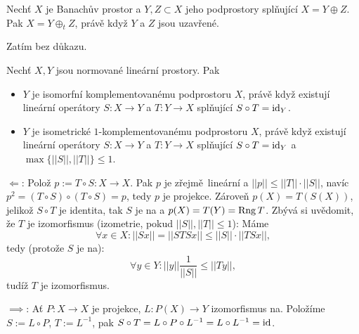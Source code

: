 \documentclass[12pt]{article}					%
\begin{document}
\begin{veta}
	Nechť $X$ je Banachův prostor a $Y, Z \subset X$ jeho podprostory splňující $X = Y \oplus Z$. Pak $X = Y \oplus_t Z$, právě když $Y$ a $Z$ jsou uzavřené.

	\begin{dukazin}
		Zatím bez důkazu.
	\end{dukazin}
\end{veta}

\begin{veta}
	Nechť $X, Y$ jsou normované lineární prostory. Pak

	\begin{itemize}
		\item $Y$ je isomorfní komplementovanému podprostoru $X$, právě když existují lineární operátory $S: X \rightarrow Y$ a $T: Y \rightarrow X$ splňující $S \circ T = \operatorname{id}_Y$.
		\item $Y$ je isometrické $1$-komplementovanému podprostoru $X$, právě když existují lineární operátory $S: X \rightarrow Y$ a $T: Y \rightarrow X$ splňující $S \circ T = \operatorname{id}_Y$ a $\max\{||S||, ||T||\} ≤ 1$.
	\end{itemize}

	\begin{dukazin}
		$\Leftarrow$: Polož $p := T \circ S: X \rightarrow X$. Pak $p$ je zřejmě lineární a $||p|| ≤ ||T||·||S||$, navíc $p^2 = (T\circ S)\circ(T \circ S) = p$, tedy $p$ je projekce. Zároveň $p(X) = T(S(X))$, jelikož $S \circ T$ je identita, tak $S$ je na a $p(X) = T(Y) = \operatorname{Rng} T$. Zbývá si uvědomit, že $T$ je izomorfismus (izometrie, pokud $||S||, ||T|| ≤ 1$): Máme
		$$ \forall x \in X: ||S x|| = ||STS x|| ≤ ||S||·||TS x||, $$
		tedy (protože $S$ je na):
		$$ \forall y \in Y: ||y||\frac{1}{||S||} ≤ ||Ty||, $$
		tudíž $T$ je izomorfismus.

		$\implies$: Ať $P: X \rightarrow X$ je projekce, $L: P(X) \rightarrow Y$ izomorfismus na. Položíme $S := L \circ P$, $T := L^{-1}$, pak $S \circ T = L \circ P \circ L^{-1} = L \circ L^{-1} = \operatorname{id}$.
	\end{dukazin}
\end{veta}
\end{document}
